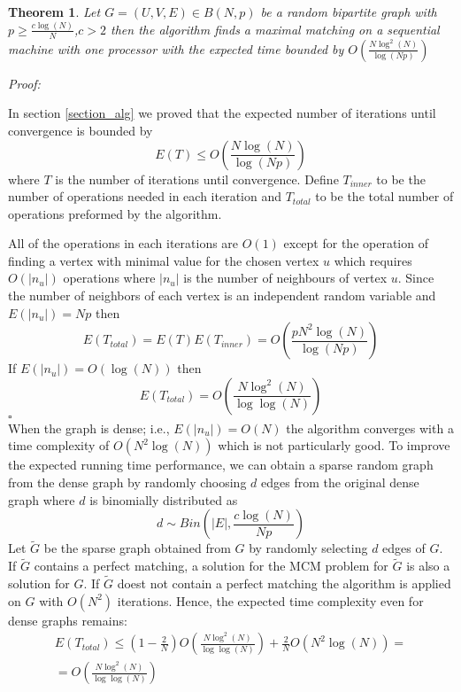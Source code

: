 \documentclass[11pt,onecolumn]{article}
\newcounter{theorem}
\newcommand{\beq}{\begin{equation}}
\newcommand{\eeq}{\end{equation}}
\newcommand{\bea}{\begin{array}}
\newcommand{\ena}{\end{array}}
\newenvironment{proof}{\textit{Proof:}}{\hfill$\square$\\}
\newtheorem{theorem}{Theorem}
\begin{document}
\begin{theorem}\label{theorem_seq} Let $G=(U,V,E)\in B(N,p)$ be a random bipartite graph with $p\geq\frac{c\log(N)}{N}$,$c>2$ then the algorithm finds a maximal matching on a sequential machine with one processor with the expected time bounded by $O\left(\frac{N\log^2(N)}{\log(Np)}\right)$
\end{theorem}
\begin{proof}

In section \ref{section_alg} we proved that the expected number of iterations until convergence is bounded by
\beq
E\left(T\right)\leq O\left(\frac{N\log(N)}{\log(Np)}\right)
\eeq
where $T$ is the number of iterations until convergence.
Define $T_{inner}$ to be the number of operations needed in each iteration and $T_{total}$ to be the total number of operations preformed by the algorithm.


All of the operations in each iterations are $O(1)$ except for the operation of finding a vertex with minimal value for the chosen vertex $u$ which requires $O(|n_u|)$ operations where $|n_u|$ is the number of neighbours of vertex $u$. Since the number of neighbors of each vertex is an independent random variable and $E(|n_u|)=Np$  then
\beq
E\left(T_{total}\right)=E\left(T\right)E\left(T_{inner}\right)=O\left(\frac{pN^2\log(N)}{\log(Np)}\right)
\eeq
If $E(|n_u|)=O\left(\log(N)\right)$ then
\beq
E\left(T_{total}\right)=O\left(\frac{N\log^2(N)}{\log\log(N)}\right)
\eeq
\end{proof}
When the graph is dense; i.e., $E(|n_u|)=O(N)$ the algorithm converges with a time complexity of $O\left(N^2\log(N)\right)$ which is not particularly good. To improve the expected running time performance, we can obtain a sparse random graph from the dense graph by randomly choosing $d$ edges from the original dense graph where $d$ is binomially distributed as
\beq
d\sim Bin(|E|,\frac{c\log(N)}{Np})
\eeq
Let $\tilde{G}$ be the sparse graph obtained from $G$ by randomly selecting $d$ edges of $G$. If $\tilde{G}$ contains a perfect matching, a solution for the MCM problem for $\tilde{G}$ is also a solution for $G$. If $\tilde{G}$ doest not contain a perfect matching the algorithm is applied on $G$ with $O\left(N^2\right)$ iterations. Hence, the expected time complexity even for dense graphs remains:
\beq
\bea{l}
\displaystyle E\left(T_{total}\right)\leq\left(1-\frac{2}{N}\right)O\left(\frac{N\log^2(N)}{\log\log(N)}\right)+\frac{2}{N}O\left(N^2\log(N)\right)=\\
\displaystyle =O\left(\frac{N\log^2(N)}{\log\log(N)}\right)
\ena
\eeq
\end{document}
